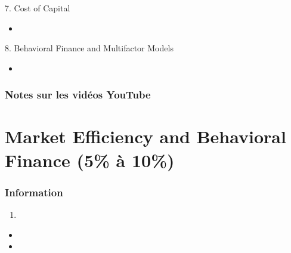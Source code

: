\documentclass[12pt, titlepage, french]{report}
\begin{document}
\begin{CHPT_SUMM_AUTO}[label = {L.-7}]{7. Cost of Capital}
	\begin{itemize}
		\item	
	\end{itemize}
\end{CHPT_SUMM_AUTO}

\begin{CHPT_SUMM_AUTO}[label = {L.-8}]{8. Behavioral Finance and Multifactor Models}
	\begin{itemize}
		\item	
	\end{itemize}
\end{CHPT_SUMM_AUTO}

\subsection{Notes sur les vidéos YouTube}


\newpage

\chapter[Market Efficiency and Behavioral Finance]{Market Efficiency and Behavioral Finance (5\% à 10\%)}

\subsection{Information}

\begin{distributions}[Objective]

\end{distributions}

\begin{outcomes}
\begin{enumerate}
	\item	
\end{enumerate}
\end{outcomes}

\begin{ASM_chapter}
\begin{itemize}
	\item	{}
	\item	{}
\end{itemize}
\end{ASM_chapter}
\end{document}
